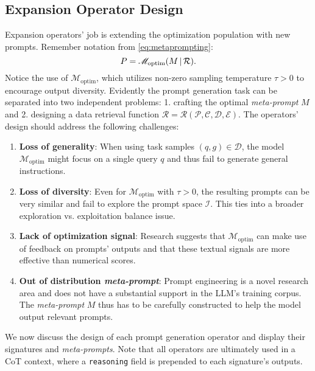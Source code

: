 \subsection{Expansion Operator Design}
Expansion operators' job is extending the optimization population with new prompts. Remember notation from \ref{eq:metaprompting}:
\begin{equation*}
    P = \mathscr{M}_{\text{optim}}(M\, \vert \, \mathcal{R}).
\end{equation*}
Notice the use of $\mathscr{M}_{\text{optim}}$, which utilizes non-zero sampling temperature $\tau > 0$ to encourage output diversity. 
Evidently the prompt generation task can be separated into two independent problems: 1. crafting the optimal \textit{meta-prompt} $M$ 
and 2. designing a data retrieval function $\mathcal{R} = \mathcal{R}(\mathscr{P}, \mathcal{C}, \mathcal{D}, \mathcal{E})$.
The operators' design should address the following challenges:
\begin{enumerate}
    \item \textbf{Loss of generality}: When using task samples $(q, g) \in \mathcal{D}$, the model $\mathscr{M}_{\text{optim}}$ might focus on a single query $q$ and thus fail to generate general instructions.
    \item \textbf{Loss of diversity}: Even for  $\mathscr{M}_{\text{optim}}$ with $\tau>0$, the resulting prompts can be very similar and fail to explore the prompt space $\mathcal{I}$. 
    This ties into a broader exploration vs. exploitation balance issue.
    \item \textbf{Lack of optimization signal}: Research\cite{he2024crispomultiaspectcritiquesuggestionguidedautomatic}\cite{xiang2025selfsupervisedpromptoptimization} suggests that $\mathscr{M}_{\text{optim}}$ 
    can make use of feedback on prompts' outputs and that these textual signals are more effective than numerical scores.
    \item \textbf{Out of distribution \textit{meta-prompt}}: Prompt engineering is a novel research area and does not have a substantial support in the LLM's training corpus.
    The \textit{meta-prompt} $M$ thus has to be carefully constructed to help the model output relevant prompts.
\end{enumerate}

We now discuss the design of each prompt generation operator and display their signatures and \textit{meta-prompts}. 
Note that all operators are ultimately used in a CoT context, where a \texttt{reasoning} field is prepended to each signature's outputs.
